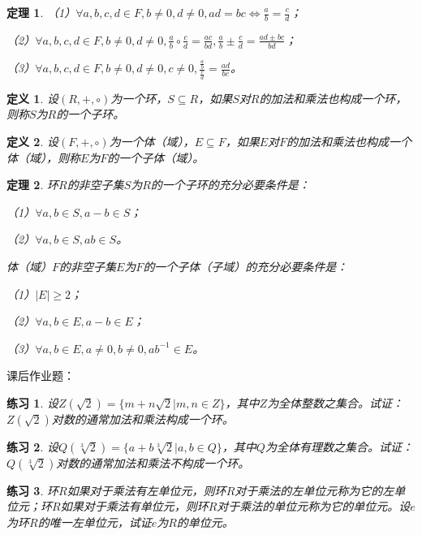 \documentclass{article}
\newtheorem{Def}{定义}
\newtheorem{Thm}{定理}
\newtheorem{Exercise}{练习}
\begin{document}
\begin{CJK*}{UTF8}{gbsn}
\begin{Thm}
    （1）$\forall a,b,c,d\in F, b\neq 0, d\neq 0, ad=bc \Leftrightarrow \frac{a}{b} = \frac{c}{d}$；
  
    （2）$\forall a,b,c,d\in F, b\neq 0, d\neq 0, \frac{a}{b}\circ \frac{c}{d}=\frac{ac}{bd}, \frac{a}{b}\pm\frac{c}{d}=\frac{ad\pm bc}{bd}$；
  
    （3）$\forall a,b,c,d\in F, b\neq 0, d\neq 0,c\neq 0, \frac{\frac{a}{b}}{\frac{c}{d}}=\frac{ad}{bc}$。
  \end{Thm}
  
  \begin{Def}
    设$(R,+,\circ)$为一个环，$S\subseteq R$，如果$S$对$R$的加法和乘法也构成一个环，则称$S$为$R$的一个子环。
  \end{Def}
  
  \begin{Def}
    设$(F,+,\circ)$为一个体（域），$E\subseteq F$，如果$E$对$F$的加法和乘法也构成一个体（域），则称$E$为$F$的一个子体（域）。
  \end{Def}
  \begin{Thm}
    环$R$的非空子集$S$为$R$的一个子环的充分必要条件是：
  
    （1）$\forall a,b\in S, a-b\in S$；
  
    （2）$\forall a,b\in S, ab\in S$。
  
    体（域）$F$的非空子集$E$为$F$的一个子体（子域）的充分必要条件是：
  
    （1）$|E|\geq 2$；
  
    （2）$\forall a,b \in E, a-b\in E$；
  
    （3）$\forall a,b \in E, a\neq 0, b\neq 0, ab^{-1}\in E$。
  \end{Thm}  



课后作业题：
\begin{Exercise}
  设$Z(\sqrt{2})=\{m+n\sqrt{2}|m,n\in Z\}$，其中$Z$为全体整数之集合。试证：$Z(\sqrt{2})$对数的通常加法和乘法构成一个环。
\end{Exercise}

\begin{Exercise}
  设$Q(\sqrt[3]{2})=\{a+b\sqrt[3]{2}|a,b\in Q\}$，其中$Q$为全体有理数之集合。试证：$Q(\sqrt[3]{2})$对数的通常加法和乘法不构成一个环。
\end{Exercise}

\begin{Exercise}
  环$R$如果对于乘法有左单位元，则环$R$对于乘法的左单位元称为它的左单位元；环$R$如果对于乘法有单位元，则环$R$对于乘法的单位元称为它的单位元。设$e$为环$R$的唯一左单位元，试证$e$为$R$的单位元。
\end{Exercise}


\end{CJK*}
\end{document}
